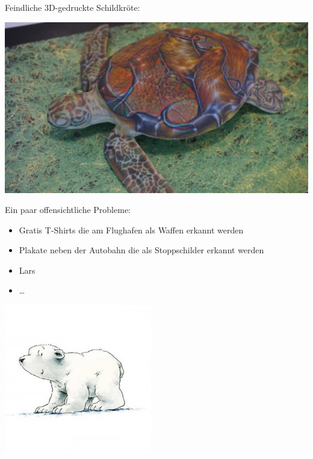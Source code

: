 \documentclass[aspectratio=43,x11names]{beamer}
\begin{document}
\begin{frame}

Feindliche 3D-gedruckte Schildkröte:
\bigskip

\includegraphics[scale=0.5]{images/rifle_turtle.jpg} 
\end{frame}


\begin{frame}
Ein paar offensichtliche Probleme:
\bigskip
\begin{multicols}{2}
\begin{itemize}
\pause\item Gratis T-Shirts die am Flughafen als Waffen erkannt werden
\pause\item Plakate neben der Autobahn die als Stoppschilder erkannt werden
\pause\item Lars
\item \dots
\end{itemize}
\columnbreak
\pause
\includegraphics[scale=0.5]{images/lars_eisbaer.png} 
\end{multicols}
\end{frame}
\end{document}
